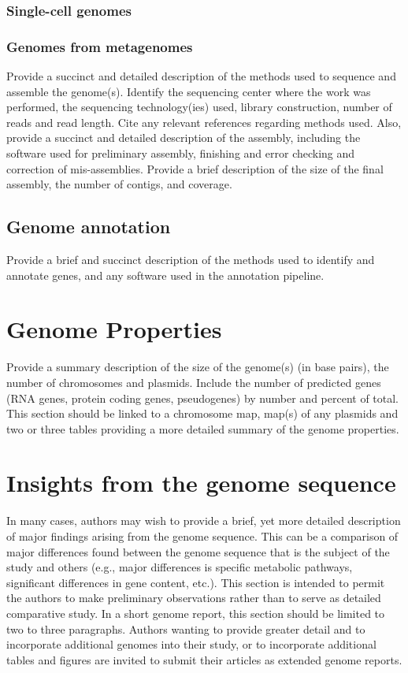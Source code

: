 \documentclass{bmcart}
\begin{document}
\subsubsection*{Single-cell genomes}

\subsubsection*{Genomes from metagenomes}

Provide a succinct and detailed description of the methods used to sequence and assemble the genome(s). Identify the sequencing center where the work was performed, the sequencing technology(ies) used, library construction, number of reads and read length. Cite any relevant references regarding methods used. Also, provide a succinct and detailed description of the assembly, including the software used for preliminary assembly, finishing and error checking and correction of mis-assemblies.  Provide a brief description of the size of the final assembly, the number of contigs, and coverage.

\subsection*{Genome annotation}
Provide a brief and succinct description of the methods used to identify and annotate genes, and any software used in the annotation pipeline.

\section*{Genome Properties}
Provide a summary description of the size of the genome(s) (in base pairs), the number of chromosomes and plasmids. Include the number of predicted genes (RNA genes, protein coding genes, pseudogenes) by number and percent of total. This section should be linked to a chromosome map, map(s) of any plasmids and two or three tables providing a more detailed summary of the genome properties.

\section*{Insights from the genome sequence}
In many cases, authors may wish to provide a brief, yet more detailed description of major findings arising from the genome sequence. This can be a comparison of major differences found between the genome sequence that is the subject of the study and others (e.g., major differences is specific metabolic pathways, significant differences in gene content, etc.). This section is intended to permit the authors to make preliminary observations rather than to serve as detailed comparative study. In a short genome report, this section should be limited to two to three paragraphs. Authors wanting to provide greater detail and to incorporate additional genomes into their study, or to incorporate additional tables and figures are invited to submit their articles as extended genome reports.
\end{document}
